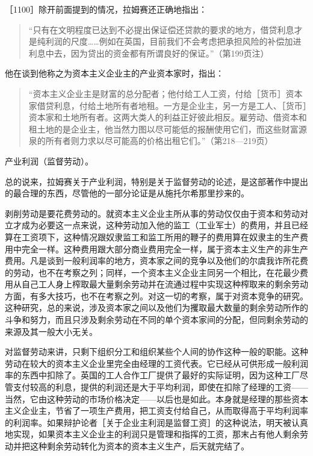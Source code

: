 ［1100］除开前面提到的情况，拉姆赛还正确地指出：

\begin{quote}{“只有在文明程度已达到不必提出保证偿还贷款的要求的地方，借贷利息才是纯利润的尺度……例如在英国，目前我们不会考虑把承担风险的补偿加进利息中去，因为贷出的资金都有所谓良好的保证。”（第199页注）}\end{quote}

他在谈到他称之为资本主义企业主的产业资本家时，指出：

\begin{quote}{“资本主义企业主是财富的总分配者；他付给工人工资，付给［货币］资本家借贷利息，付给土地所有者地租。一方是企业主，另一方是工人、［货币］资本家和土地所有者。这两大类人的利益正好彼此相反。雇劳动、借资本和租土地的是企业主，他当然力图以尽可能低的报酬使用它们，而这些财富源泉的所有者则力求以尽可能高的价格出租它们。”（第218—219页）}\end{quote}

产业利润（监督劳动）。

总的说来，拉姆赛关于产业利润，特别是关于监督劳动的论述，是这部著作中提出的最合理的东西，尽管他的一部分论证是从施托尔希那里抄来的。

剥削劳动是要花费劳动的。就资本主义企业主所从事的劳动仅仅由于资本和劳动对立才成为必要这一点来说，这种劳动加入他的监工（工业军士）的费用，并且已经算在工资项下，这种情况跟奴隶监工和监工所用的鞭子的费用算在奴隶主的生产费用中完全一样。这种费用跟大部分商业费用完全一样，属于资本主义生产的非生产费用。凡是谈到一般利润率的地方，资本家之间的竞争以及他们的尔虞我诈所花费的劳动，也不在考察之列；同样，一个资本主义企业主同另一个相比，在花最少费用从自己工人身上榨取最大量剩余劳动并在流通过程中实现这种榨取来的剩余劳动方面，有多大技巧，也不在考察之列。对这一切的考察，属于对资本竞争的研究。这种研究，总的来说，涉及资本家之间以及他们为攫取最大数量的剩余劳动所作的斗争和努力，而且只涉及剩余劳动在不同的单个资本家间的分配，但同剩余劳动的来源及其一般大小无关。

对监督劳动来讲，只剩下组织分工和组织某些个人间的协作这种一般的职能。这种劳动在较大的资本主义企业里完全由经理的工资代表。它已经从可供形成一般利润率的东西中扣除了。英国的工人合作工厂提供了最好的实际证明，因为这种工厂尽管支付较高的利息，提供的利润还是大于平均利润，即使在扣除了经理的工资——当然，它由这种劳动的市场价格决定——以后也是如此。本身就是经理的那些资本主义企业主，节省了一项生产费用，把工资支付给自己，从而取得高于平均利润率的利润率。如果辩护论者［关于企业主利润是监督工资］的这种说法，明天被认真地实现，如果资本主义企业主的利润只是管理和指挥的工资，那末占有他人剩余劳动并把这种剩余劳动转化为资本的资本主义生产，后天就完结了。

